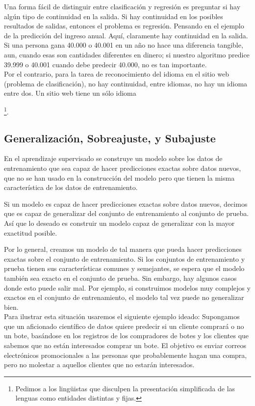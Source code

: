 Una forma fácil de distinguir entre clasificación y regresión es  preguntar si hay algún  tipo de continuidad en la salida. Si hay continuidad en los posibles resultados de salidas, entonces el problema es regresión.  Pensando en el ejemplo de la predicción del ingreso anual. Aquí, claramente hay continuidad en la salida. Si una persona gana 40.000 o 40.001 en un año no hace una diferencia tangible, aun, cuando esas son cantidades diferentes en dinero; si nuestro algoritmo predice 39.999 o 40.001 cuando debe predecir 40.000, no es tan importante.  \\


Por el contrario, para la tarea de reconocimiento del idioma en el sitio web (problema de clasificación), no hay continuidad, entre idiomas, no hay un idioma entre dos. Un sitio web tiene un sólo idioma{\footnote{Pedimos a los lingüistas que disculpen la presentación simplificada de las lenguas como entidades distintas y fijas.}.   

\subsection{Generalización, Sobreajuste,  y Subajuste}  

En el aprendizaje supervisado se  construye un modelo sobre los datos de entrenamiento  que sea capaz de hacer predicciones exactas sobre datos nuevos, que no se han usado en la construcción del modelo pero que   tienen la misma característica de los datos de entrenamiento.

 Si un modelo es capaz de hacer predicciones exactas sobre 	datos nuevos, decimos que es capaz de generalizar del conjunto de entrenamiento al conjunto de prueba. Así que lo deseado es construir un modelo capaz de generalizar con la mayor exactitud posible.


Por lo general, creamos un modelo de tal manera que pueda hacer predicciones exactas sobre el conjunto de entrenamiento. Si los conjuntos de entrenamiento  y  prueba  tienen  sus  características  comunes  y  semejantes,  se espera que el modelo  también  sea  exacto  en el conjunto de prueba.  Sin embargo, hay algunos casos donde esto puede salir mal. Por ejemplo, si construimos modelos muy complejos y exactos en el conjunto de entrenamiento, el modelo tal vez puede no generalizar bien. \\


Para ilustrar esta situación usaremos el siguiente ejemplo ideado: Supongamos que un aficionado científico de datos quiere predecir si un cliente comprará o no un bote, basándose en los registros de los compradores  de  botes  y  los clientes que sabemos que no están interesados comprar un bote. El objetivo es enviar correos electrónicos promocionales a las personas que probablemente hagan una compra, pero no molestar a aquellos clientes que no estarán interesados.\\


}
